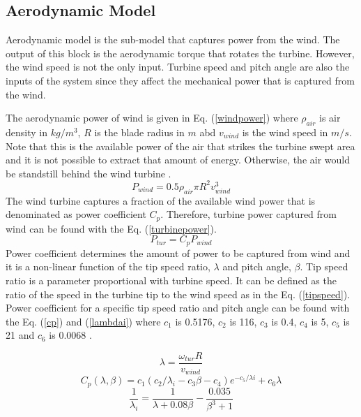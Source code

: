 \subsection{Aerodynamic Model}
Aerodynamic model is the sub-model that captures power from the wind. The output of this block is the aerodynamic torque that rotates the turbine. However, the wind speed is not the only input. Turbine speed and pitch angle are also the inputs of the system since they affect the mechanical power that is captured from the wind.\par
The aerodynamic power of wind is given in Eq. (\ref{windpower}) where $\rho_{air}$ is air density in $kg/m^{3}$, $R$ is the blade radius in $m$ abd $v_{wind}$ is the wind speed in $m/s$. Note that this is the available power of the air that strikes the turbine swept area and it is not possible to extract that amount of energy. Otherwise, the air would be standstill behind the wind turbine \cite{Ackermann2005a}.
\begin{equation}
P_{wind}=0.5\rho_{air}\pi R^{2} v_{wind}^{3}
\label{windpower}
\end{equation}
The wind turbine captures a fraction of the available wind power that is denominated as power coefficient $C_{p}$. Therefore, turbine power captured from wind can be found with the Eq. (\ref{turbinepower}).
\begin{equation}
P_{tur}=C_{p}P_{wind}
\label{turbinepower}
\end{equation}
Power coefficient determines the amount of power to be captured from wind and it is a non-linear function of the tip speed ratio, $\lambda$ and pitch angle, $\beta$. Tip speed ratio is a parameter proportional with turbine speed. It can be defined as the ratio of the speed in the turbine tip to the wind speed as in the Eq. (\ref{tipspeed}). Power coefficient for a specific tip speed ratio and pitch angle can be found with the Eq. (\ref{cp}) and (\ref{lambdai}) where $c_{1}$ is 0.5176, $c_{2}$ is 116, $c_{3}$ is 0.4, $c_{4}$ is 5, $c_{5}$ is 21 and $c_{6}$ is 0.0068 \cite{Heier}.\par
\begin{equation}
\lambda=\frac{\omega_{tur}R}{v_{wind}}
\label{tipspeed}
\end{equation}
\begin{equation}
C_{p}(\lambda,\beta)=c_{1}(c_{2}/\lambda_{i}-c_{3}\beta-c_{4})e^{-c_{5}/\lambda{i}}+c_{6}\lambda
\label{cp}
\end{equation}
\begin{equation}
\frac{1}{\lambda_{i}}=\frac{1}{\lambda+0.08\beta}-\frac{0.035}{\beta^{3}+1} 
\label{lambdai}
\end{equation}
